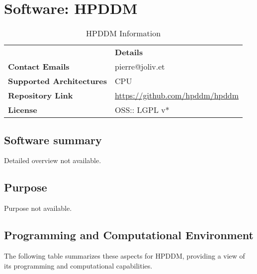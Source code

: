 \section{Software: HPDDM}
\label{sec:HPDDM:software}



\begin{table}[h!]
    \centering
    { \setlength{\parindent}{0pt}
    \def\arraystretch{1.25}
    {\fontsize{9}{11}\selectfont
    \begin{tabular}{!{\color{numpexgray}\vrule}p{.4\textwidth}!{\color{numpexgray}\vrule}p{.6\textwidth}!{\color{numpexgray}\vrule}}
         & {\rule{0pt}{2.5ex}\color{white}\bf Details} \\

        \textbf{Contact Emails} & pierre@joliv.et \\
        \textbf{Supported Architectures} & CPU \\
        \textbf{Repository Link} & \href{https://github.com/hpddm/hpddm}{https://github.com/hpddm/hpddm} \\
        \textbf{License} & OSS:: LGPL v* \\
        \bottomrule
    \end{tabular}
    }}
    \caption{HPDDM Information}
\end{table}

\subsection{Software summary}
\label{sec:HPDDM:summary}
Detailed overview not available.



\subsection{Purpose}
\label{sec:HPDDM:purpose}
Purpose not available.

\subsection{Programming and Computational Environment}
\label{sec::HPDDM:environment_capabilities}


The following table summarizes these aspects for HPDDM, providing a  view of its programming and computational capabilities.

